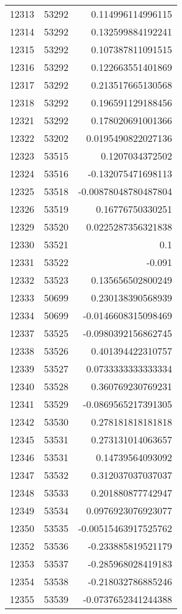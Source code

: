 \begin{tabular}{r | r | r}
12313 & 53292 & 0.114996114996115 \\
12314 & 53292 & 0.132599884192241 \\
12315 & 53292 & 0.107387811091515 \\
12316 & 53292 & 0.122663551401869 \\
12317 & 53292 & 0.213517665130568 \\
12318 & 53292 & 0.196591129188456 \\
12321 & 53292 & 0.178020691001366 \\
12322 & 53202 & 0.0195490822027136 \\
12323 & 53515 & 0.1207034372502 \\
12324 & 53516 & -0.132075471698113 \\
12325 & 53518 & -0.00878048780487804 \\
12326 & 53519 & 0.16776750330251 \\
12329 & 53520 & 0.0225287356321838 \\
12330 & 53521 & 0.1 \\
12331 & 53522 & -0.091 \\
12332 & 53523 & 0.135656502800249 \\
12333 & 50699 & 0.230138390568939 \\
12334 & 50699 & -0.0146608315098469 \\
12337 & 53525 & -0.0980392156862745 \\
12338 & 53526 & 0.401394422310757 \\
12339 & 53527 & 0.0733333333333334 \\
12340 & 53528 & 0.360769230769231 \\
12341 & 53529 & -0.0869565217391305 \\
12342 & 53530 & 0.278181818181818 \\
12345 & 53531 & 0.273131014063657 \\
12346 & 53531 & 0.14739564093092 \\
12347 & 53532 & 0.312037037037037 \\
12348 & 53533 & 0.201880877742947 \\
12349 & 53534 & 0.0976923076923077 \\
12350 & 53535 & -0.00515463917525762 \\
12352 & 53536 & -0.233885819521179 \\
12353 & 53537 & -0.285968028419183 \\
12354 & 53538 & -0.218032786885246 \\
12355 & 53539 & -0.0737652341244388 \\

\end{tabular}
